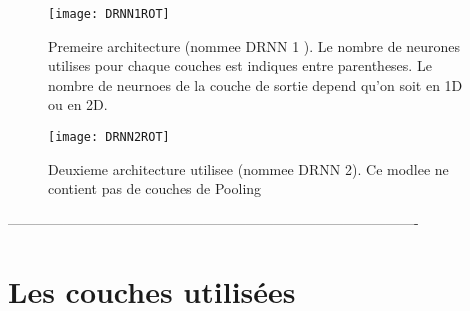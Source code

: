 \clearpage
\begin{figure}[ht!]
   \begin{minipage}{0.6\textwidth}
     \centering
     \texttt{[image: DRNN1ROT]}
     \decoRule
     \caption[DRNN1]{Premeire architecture (nommee DRNN 1 ). Le nombre de neurones utilises pour     
     chaque couches est indiques entre parentheses. Le nombre de neurnoes de la couche de sortie 
     depend qu'on soit en 1D ou en 2D.}
     \label{fig:DRNN1}
   \end{minipage}\hfill
   \begin{minipage}{0.4\textwidth}
     \centering
     \texttt{[image: DRNN2ROT]}
     \decoRule
     \caption[DRNN2]{Deuxieme architecture utilisee (nommee DRNN 2). Ce modlee ne contient pas de 
     couches de Pooling \footnotemark }
     \label{fig:DRNN2}
   \end{minipage}
\end{figure}

% 
% 

----------------------------------------------------------------------------------------
\section{Les couches utilisées}

